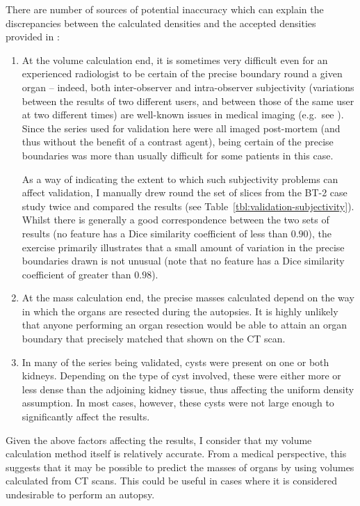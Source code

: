 There are number of sources of potential inaccuracy which can explain the discrepancies between the calculated densities and the accepted densities provided in \cite{woodard86}:
%
\begin{enumerate}

\item At the volume calculation end, it is sometimes very difficult even for an experienced radiologist to be certain of the precise boundary round a given organ -- indeed, both inter-observer and intra-observer subjectivity (variations between the results of two different users, and between those of the same user at two different times) are well-known issues in medical imaging (e.g.~see \cite{sampat06}). Since the series used for validation here were all imaged post-mortem (and thus without the benefit of a contrast agent), being certain of the precise boundaries was more than usually difficult for some patients in this case.

As a way of indicating the extent to which such subjectivity problems can affect validation, I manually drew round the set of slices from the BT-2 case study twice and compared the results (see Table~\ref{tbl:validation-subjectivity}). Whilst there is generally a good correspondence between the two sets of results (no feature has a Dice similarity coefficient of less than $0.90$), the exercise primarily illustrates that a small amount of variation in the precise boundaries drawn is not unusual (note that no feature has a Dice similarity coefficient of greater than $0.98$).

\item At the mass calculation end, the precise masses calculated depend on the way in which the organs are resected during the autopsies. It is highly unlikely that anyone performing an organ resection would be able to attain an organ boundary that precisely matched that shown on the CT scan.

\item In many of the series being validated, cysts were present on one or both kidneys. Depending on the type of cyst involved, these were either more or less dense than the adjoining kidney tissue, thus affecting the uniform density assumption. In most cases, however, these cysts were not large enough to significantly affect the results.

\end{enumerate}
%
Given the above factors affecting the results, I consider that my volume calculation method itself is relatively accurate. From a medical perspective, this suggests that it may be possible to predict the masses of organs by using volumes calculated from CT scans. This could be useful in cases where it is considered undesirable to perform an autopsy.

